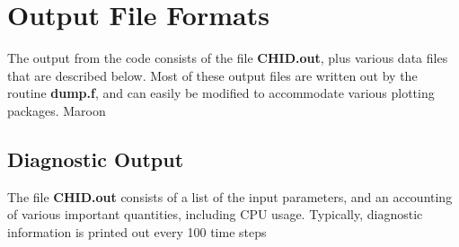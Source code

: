 \documentclass[11pt]{book}
\begin{document}
\chapter{Output File Formats}

The output from the code consists of the file {\bf CHID.out}, plus various
data files that are described below.
Most of these output files are written out by the routine {\bf dump.f},
and can easily be modified to accommodate various plotting packages.
Maroon

\section{Diagnostic Output}%

\label{out:file}

The file {\bf CHID.out} consists of a list of the input
parameters, and an accounting of various important quantities, including
CPU usage. Typically, diagnostic information is printed out every
100 time steps
\end{document}
